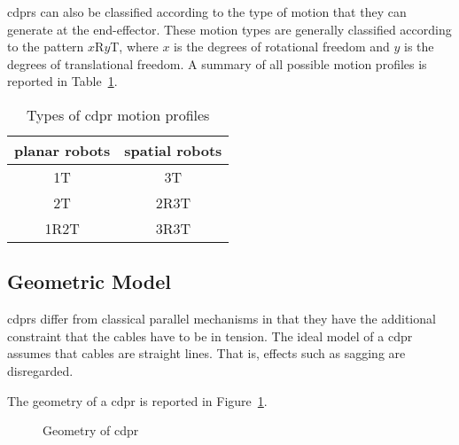 		\glspl{cdpr} can also be classified according to the type of motion that
		they can generate at the end-effector. These motion types are generally
		classified according to the pattern $x$R$y$T, where $x$ is the degrees
		of rotational freedom and $y$ is the degrees of translational freedom. A
		summary of all possible motion profiles is reported in
		Table~\ref{tab:types_of_cdpr_motion_profiles}.

		\begin{table}[ht]
			\centering
			\begin{tabular}{c c}
				\toprule
				planar robots & spatial robots \\
				\midrule
				1T 			& 	3T \\
				2T 			& 	2R3T \\
				1R2T 		& 	3R3T
			\end{tabular}
			\caption{Types of \gls{cdpr} motion profiles}%
			\label{tab:types_of_cdpr_motion_profiles}
		\end{table}

	\subsection{Geometric Model}%
	\label{sec:geometric_model}

		\glspl{cdpr} differ from classical parallel mechanisms in that they have
		the additional constraint that the cables have to be in tension. The
		ideal model of a \gls{cdpr} assumes that cables are straight lines. That
		is, effects such as sagging are disregarded.

		The geometry of a \gls{cdpr} is reported in
		Figure~\ref{fig:geometry_of_cdpr}.

		\begin{figure}[hb]
			\caption{Geometry of \gls{cdpr}}%
			\label{fig:geometry_of_cdpr}
		\end{figure}


